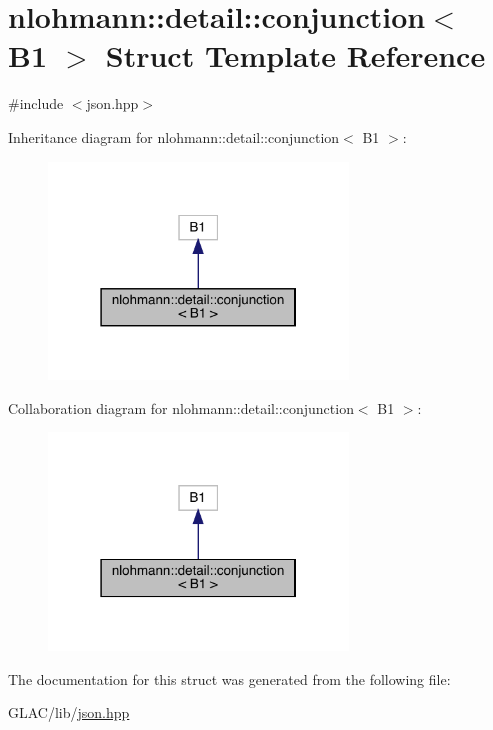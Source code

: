 \hypertarget{structnlohmann_1_1detail_1_1conjunction_3_01_b1_01_4}{}\section{nlohmann\+::detail\+::conjunction$<$ B1 $>$ Struct Template Reference}
\label{structnlohmann_1_1detail_1_1conjunction_3_01_b1_01_4}


{\ttfamily \#include $<$json.\+hpp$>$}



Inheritance diagram for nlohmann\+::detail\+::conjunction$<$ B1 $>$\+:\nopagebreak
\begin{figure}[H]
\begin{center}
\leavevmode
\includegraphics[width=226pt]{structnlohmann_1_1detail_1_1conjunction_3_01_b1_01_4__inherit__graph}
\end{center}
\end{figure}


Collaboration diagram for nlohmann\+::detail\+::conjunction$<$ B1 $>$\+:\nopagebreak
\begin{figure}[H]
\begin{center}
\leavevmode
\includegraphics[width=226pt]{structnlohmann_1_1detail_1_1conjunction_3_01_b1_01_4__coll__graph}
\end{center}
\end{figure}


The documentation for this struct was generated from the following file\+:\begin{DoxyCompactItemize}
\item 
G\+L\+A\+C/lib/\mbox{\hyperlink{json_8hpp}{json.\+hpp}}\end{DoxyCompactItemize}
